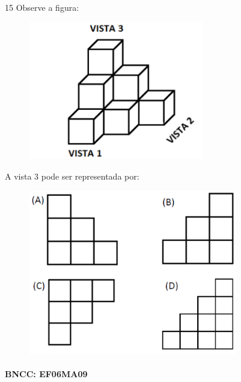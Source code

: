 \num{15} Observe a figura:

\begin{figure}
\includegraphics[width=3.01693in,height=2.38354in]{./imgSAEB_6_MAT/media/image112.png}
\end{figure}

A vista $3$ pode ser representada por:

\begin{figure}
\includegraphics[width=3.59198in,height=2.82524in]{./imgSAEB_6_MAT/media/image113.png}
\end{figure}

\paragraph{BNCC: EF06MA09 }


